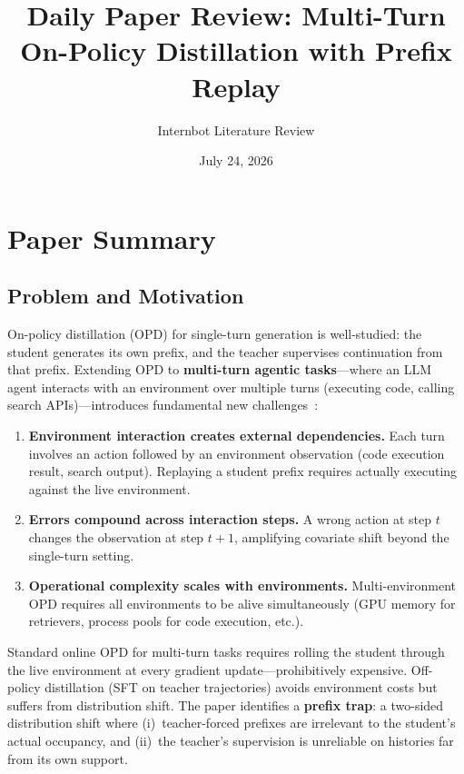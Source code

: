 \documentclass[11pt,a4paper]{article}
\title{Daily Paper Review: Multi-Turn On-Policy Distillation with Prefix Replay}
\author{Internbot Literature Review}
\date{July 24, 2026}
\begin{document}
\maketitle

\section{Paper Summary}

\subsection{Problem and Motivation}

On-policy distillation (OPD) for single-turn generation is well-studied: the student generates its own prefix, and the teacher supervises continuation from that prefix. Extending OPD to \textbf{multi-turn agentic tasks}---where an LLM agent interacts with an environment over multiple turns (executing code, calling search APIs)---introduces fundamental new challenges~\cite{liao2026multiturn}:

\begin{enumerate}
    \item \textbf{Environment interaction creates external dependencies.} Each turn involves an action followed by an environment observation (code execution result, search output). Replaying a student prefix requires actually executing against the live environment.
    \item \textbf{Errors compound across interaction steps.} A wrong action at step $t$ changes the observation at step $t+1$, amplifying covariate shift beyond the single-turn setting.
    \item \textbf{Operational complexity scales with environments.} Multi-environment OPD requires all environments to be alive simultaneously (GPU memory for retrievers, process pools for code execution, etc.).
\end{enumerate}

Standard online OPD for multi-turn tasks requires rolling the student through the live environment at every gradient update---prohibitively expensive. Off-policy distillation (SFT on teacher trajectories) avoids environment costs but suffers from distribution shift. The paper identifies a \textbf{prefix trap}: a two-sided distribution shift where (i)~teacher-forced prefixes are irrelevant to the student's actual occupancy, and (ii)~the teacher's supervision is unreliable on histories far from its own support.
\end{document}
